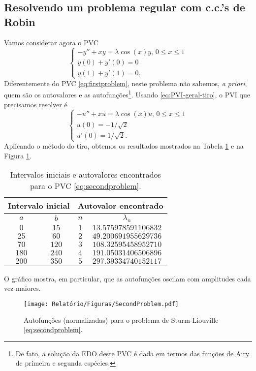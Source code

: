 \documentclass[twocolumn,showpacs,%
  nofootinbib,aps,superscriptaddress,%
  eqsecnum,prd,notitlepage,showkeys,10pt]{revtex4-1}
\renewcommand{\leq}{\leqslant}
\begin{document}
\subsection{Resolvendo um problema regular com c.c.'s de Robin}\label{subsec:aplicacao}
%
Vamos considerar agora o PVC
%
\begin{equation}
\label{eq:secondproblem}
    \left\{
        \begin{array}{l}
            -y'' + xy = \lambda\cos(x)y, \, 0 \leq x \leq 1 \\ 
            y(0) + y'(0) = 0 \\ 
            y(1) + y'(1) = 0.
        \end{array}
    \right.
\end{equation}
%
Diferentemente do PVC \eqref{eq:firstproblem}, neste problema não sabemos, \textit{a priori},
quem são os autovalores e as autofunções\footnote{De fato, a solução da EDO deste PVC
é dada em termos das \href{https://en.wikipedia.org/wiki/Airy_function}{funções de Airy}
de primeira e segunda espécies.}.
Usando \eqref{eq:PVI-geral-tiro}, o PVI que precisamos resolver é
%
\[
    \left\{
        \begin{array}{l}
            -u'' + xu = \lambda \cos(x)u, \, 0 \leq x \leq 1 \\ 
            u(0) = -1/\sqrt{2} \\ 
            u'(0) = 1/\sqrt{2}.
        \end{array}
    \right.
\]
%
Aplicando o método do tiro, obtemos os resultados mostrados
na Tabela \ref{tab:secondproblem} e na Figura \ref{fig:second-problem}.
%
\begin{table}[H]
    \centering
    \caption{Intervalos iniciais e autovalores encontrados para o PVC \eqref{eq:secondproblem}.}
    \begin{tabular}{cc|cc}
        \multicolumn{2}{c}{Intervalo inicial} & \multicolumn{2}{c}{Autovalor encontrado} \\
        \hline
        $a$ & $b$ & $n$ & $\lambda_n$ \\
        \hline
        $0$ & $15$ & $1$ & $13.575978591106832$ \\
        $25$ & $60$ & $2$ & $49.200691955629736$ \\
        $70$ & $120$ & $3$ & $108.32595458952710$ \\
        $180$ & $240$ & $4$ & $191.05031406506896$ \\
        $200$ & $350$ & $5$ & $297.39334740152117$ \\
        \hline
    \end{tabular}
    \label{tab:secondproblem}
\end{table}
%
O gráfico mostra, em particular, que as autofunções oscilam com amplitudes
cada vez maiores.
%
\begin{figure}[H]
    \centering
    \texttt{[image: Relatório/Figuras/SecondProblem.pdf]}
    \caption{Autofunções (normalizadas) para o problema de Sturm-Liouville
    \eqref{eq:secondproblem}.}
    \label{fig:second-problem}
\end{figure}
%
%
\end{document}
